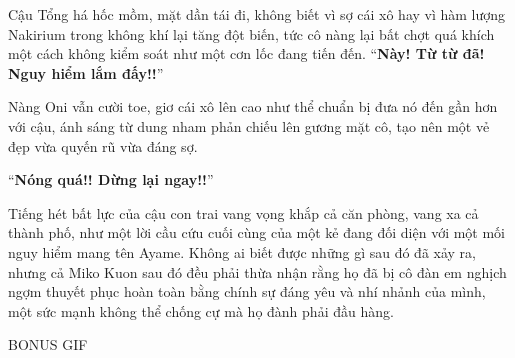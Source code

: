 \documentclass[../main.tex]{subfiles}
\begin{document}
Cậu Tổng há hốc mồm, mặt dần tái đi, không biết vì sợ cái xô hay vì hàm lượng Nakirium trong không khí lại tăng đột biến, tức cô nàng lại bất chợt quá khích một cách không kiểm soát như một cơn lốc đang tiến đến. ``\textbf{Này! Từ từ đã! Nguy hiểm lắm đấy!!}''

Nàng Oni vẫn cười toe, giơ cái xô lên cao như thể chuẩn bị đưa nó đến gần hơn với cậu, ánh sáng từ dung nham phản chiếu lên gương mặt cô, tạo nên một vẻ đẹp vừa quyến rũ vừa đáng sợ.

``\textbf{Nóng quá!! Dừng lại ngay!!}''

Tiếng hét bất lực của cậu con trai vang vọng khắp cả căn phòng, vang xa cả thành phố, như một lời cầu cứu cuối cùng của một kẻ đang đối diện với một mối nguy hiểm mang tên Ayame. Không ai biết được những gì sau đó đã xảy ra, nhưng cả Miko Kuon sau đó đều phải thừa nhận rằng họ đã bị cô đàn em nghịch ngợm thuyết phục hoàn toàn bằng chính sự đáng yêu và nhí nhảnh của mình, một sức mạnh không thể chống cự mà họ đành phải đầu hàng.

\begin{center}{\ab BONUS GIF}\end{center}

\end{document}
